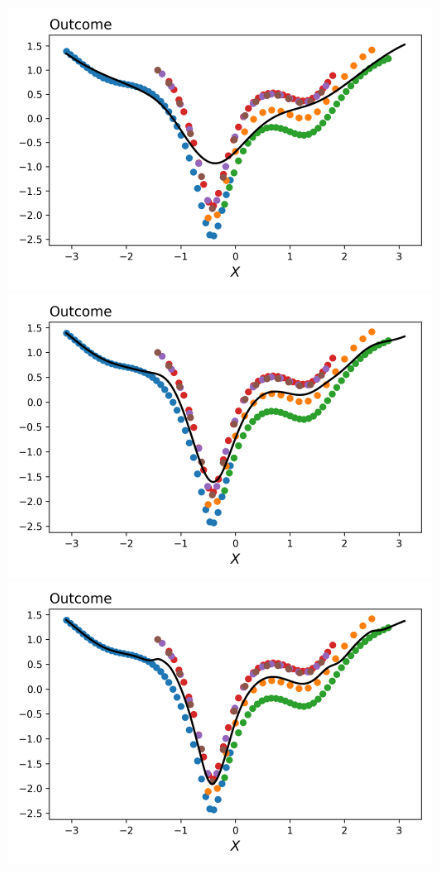 \documentclass[a4paper,12pt]{article}
\begin{document}
\begin{figure}[htbp]
\includegraphics[scale=0.3]{figures/framework/local_linear_no_const_2.0_18_LM.png}
\includegraphics[scale=0.3]{figures/framework/local_linear_no_const_5.0_18_LM.png}
\includegraphics[scale=0.3]{figures/framework/local_linear_no_const_10.0_18_LM.png}

\end{figure}
\end{document}
